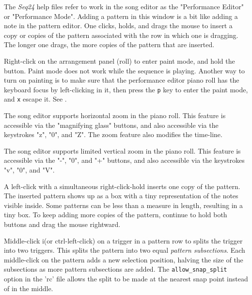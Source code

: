    The \textsl{Seq24} help files refer to work in the song editor as the
   "Performance Editor" or "Performance Mode".  Adding a pattern in this
   window is a bit like adding a note in the pattern editor.
   One clicks, holds, and drags the mouse to insert a copy or copies of the
   pattern associated with the row in which one is dragging.
   The longer one drags, the more copies of the pattern that are inserted.

	Right-click on the arrangement panel (roll) to enter
   paint mode, and hold the button.
   Paint mode does not work while the sequence is playing.
   Another way to turn on painting is to
   make sure that the performance editor piano roll has the
   keyboard focus by left-clicking in it, then press the
   \texttt{p} key to enter the paint mode, and
   \texttt{x} escape it.
   See .

   The song editor supports horizontal zoom in the piano roll.
   This feature is accessible via the "magnifying glass" buttons, and also
   accessible via the keystrokes "z", "0", and "Z".
   The zoom feature also modifies the time-line.

   The song editor supports limited vertical zoom in the piano roll.
   This feature is accessible via the "-", "0", and "+" buttons, and also
   accessible via the keystrokes "v", "0", and "V".

   A left-click with a simultaneous right-click-hold inserts one copy of the
   pattern.  The inserted pattern shows up as a box with a tiny
   representation of the notes visible inside.  Some patterns can
   be less than a measure in length, resulting in a tiny box.
   To keep adding more copies of the pattern, continue to hold both buttons
   and drag the mouse rightward.

   Middle-click i(or ctrl-left-click) on a trigger in a pattern row
   to splits the trigger into two triggers.
   This splits the pattern into two equal \textsl{pattern subsections}.
   Each middle-click on the pattern adds a new selection position,
   halving the size of the subsections as more pattern subsections are
   added.  The \texttt{allow\_snap\_split} option in the 'rc' file
   allows the split to be made at the nearest snap point instead of in the
   middle.

